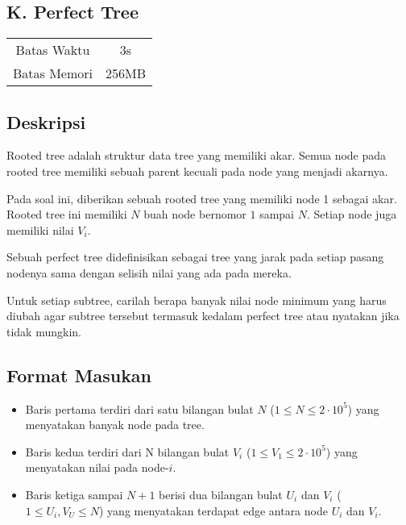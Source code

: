 \documentclass{article}
\begin{document}
\begin{center}
    \section*{K. Perfect Tree} %

    \begin{tabular}{ | c c | }
        \hline
        Batas Waktu  & 3s \\    %
        Batas Memori & 256MB \\  %
        \hline
    \end{tabular}
\end{center}

\subsection*{Deskripsi}

Rooted tree adalah struktur data tree yang memiliki akar. Semua node pada rooted tree memiliki sebuah parent kecuali pada node yang menjadi akarnya.

Pada soal ini, diberikan sebuah rooted tree yang memiliki node 1 sebagai akar. Rooted tree ini memiliki $N$ buah node bernomor $1$ sampai $N$. Setiap node juga memiliki nilai $V_i$.

Sebuah perfect tree didefinisikan sebagai tree yang jarak pada setiap pasang nodenya sama dengan selisih nilai yang ada pada mereka.

Untuk setiap subtree, carilah berapa banyak nilai node minimum yang harus diubah agar subtree tersebut termasuk kedalam perfect tree atau nyatakan jika tidak mungkin.


\subsection*{Format Masukan}

\begin{itemize}
    \item Baris pertama terdiri dari satu bilangan bulat $N$ ($1 \leq N \leq 2 \cdot 10^5$) yang menyatakan banyak node pada tree.
    \item Baris kedua terdiri dari N bilangan bulat $V_i$ ($1 \leq V_1 \leq 2 \cdot 10^5$) yang menyatakan nilai pada node-$i$.
    \item Baris ketiga sampai $N + 1$ berisi dua bilangan bulat $U_i$ dan $V_i$ ($1 \leq U_i, V_U \leq N$) yang menyatakan terdapat edge antara node $U_i$ dan $V_i$.
\end{itemize}
\end{document}
